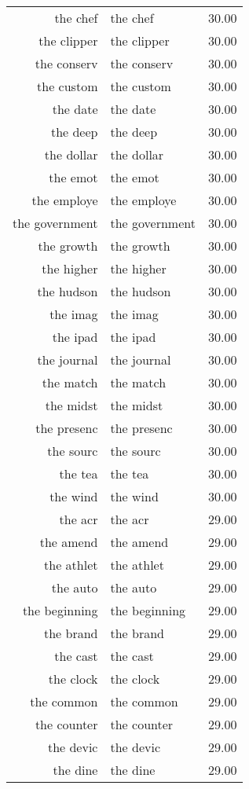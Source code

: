 \begin{table}[ht]
\begin{tabular}{rlr}
  the chef & the chef & 30.00 \\ 
  the clipper & the clipper & 30.00 \\ 
  the conserv & the conserv & 30.00 \\ 
  the custom & the custom & 30.00 \\ 
  the date & the date & 30.00 \\ 
  the deep & the deep & 30.00 \\ 
  the dollar & the dollar & 30.00 \\ 
  the emot & the emot & 30.00 \\ 
  the employe & the employe & 30.00 \\ 
  the government & the government & 30.00 \\ 
  the growth & the growth & 30.00 \\ 
  the higher & the higher & 30.00 \\ 
  the hudson & the hudson & 30.00 \\ 
  the imag & the imag & 30.00 \\ 
  the ipad & the ipad & 30.00 \\ 
  the journal & the journal & 30.00 \\ 
  the match & the match & 30.00 \\ 
  the midst & the midst & 30.00 \\ 
  the presenc & the presenc & 30.00 \\ 
  the sourc & the sourc & 30.00 \\ 
  the tea & the tea & 30.00 \\ 
  the wind & the wind & 30.00 \\ 
  the acr & the acr & 29.00 \\ 
  the amend & the amend & 29.00 \\ 
  the athlet & the athlet & 29.00 \\ 
  the auto & the auto & 29.00 \\ 
  the beginning & the beginning & 29.00 \\ 
  the brand & the brand & 29.00 \\ 
  the cast & the cast & 29.00 \\ 
  the clock & the clock & 29.00 \\ 
  the common & the common & 29.00 \\ 
  the counter & the counter & 29.00 \\ 
  the devic & the devic & 29.00 \\ 
  the dine & the dine & 29.00 \\ 

\end{tabular}
\end{table}
